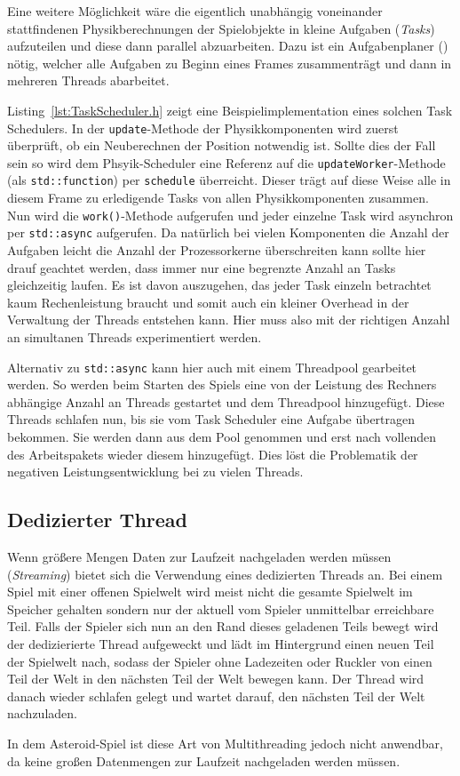 \documentclass[12pt, a4paper, titlepage, hidelinks]{scrreprt}
\begin{document}
Eine weitere Möglichkeit wäre die eigentlich unabhängig voneinander stattfindenen Physikberechnungen der Spielobjekte in kleine Aufgaben (\textit{Tasks}) aufzuteilen und diese dann parallel abzuarbeiten. Dazu ist ein Aufgabenplaner () nötig, welcher alle Aufgaben zu Beginn eines Frames zusammenträgt und dann in mehreren Threads abarbeitet.

Listing~\autoref{lst:TaskScheduler.h} zeigt eine Beispielimplementation eines solchen Task Schedulers. In der \texttt{update}-Methode der Physikkomponenten wird zuerst überprüft, ob ein Neuberechnen der Position notwendig ist. Sollte dies der Fall sein so wird dem Phsyik-Scheduler eine Referenz auf die \texttt{updateWorker}-Methode (als \texttt{std::function}) per \texttt{schedule} überreicht. Dieser trägt auf diese Weise alle in diesem Frame zu erledigende Tasks von allen Physikkomponenten zusammen. Nun wird die \texttt{work()}-Methode aufgerufen und jeder einzelne Task wird asynchron per \texttt{std::async} aufgerufen. Da natürlich bei vielen Komponenten die Anzahl der Aufgaben leicht die Anzahl der Prozessorkerne überschreiten kann sollte hier drauf geachtet werden, dass immer nur eine begrenzte Anzahl an Tasks gleichzeitig laufen. Es ist davon auszugehen, das jeder Task einzeln betrachtet kaum Rechenleistung braucht und somit auch ein kleiner Overhead in der Verwaltung der Threads entstehen kann. Hier muss also mit der richtigen Anzahl an simultanen Threads experimentiert werden.

Alternativ zu \texttt{std::async} kann hier auch mit einem Threadpool gearbeitet werden. So werden beim Starten des Spiels eine von der Leistung des Rechners abhängige Anzahl an Threads gestartet und dem Threadpool hinzugefügt. Diese Threads schlafen nun, bis sie vom Task Scheduler eine Aufgabe übertragen bekommen. Sie werden dann aus dem Pool genommen und erst nach vollenden des Arbeitspakets wieder diesem hinzugefügt. Dies löst die Problematik der negativen Leistungsentwicklung bei zu vielen Threads.


\subsection{Dedizierter Thread}
Wenn größere Mengen Daten zur Laufzeit nachgeladen werden müssen (\textit{Streaming}) bietet sich die Verwendung eines dedizierten Threads an. Bei einem Spiel mit einer offenen Spielwelt wird meist nicht die gesamte Spielwelt im Speicher gehalten sondern nur der aktuell vom Spieler unmittelbar erreichbare Teil. Falls der Spieler sich nun an den Rand dieses geladenen Teils bewegt wird der dedizierierte Thread aufgeweckt und lädt im Hintergrund einen neuen Teil der Spielwelt nach, sodass der Spieler ohne Ladezeiten oder Ruckler von einen Teil der Welt in den nächsten Teil der Welt bewegen kann. Der Thread wird danach wieder schlafen gelegt und wartet darauf, den nächsten Teil der Welt nachzuladen.

In dem Asteroid-Spiel ist diese Art von Multithreading jedoch nicht anwendbar, da keine großen Datenmengen zur Laufzeit nachgeladen werden müssen.
\end{document}
